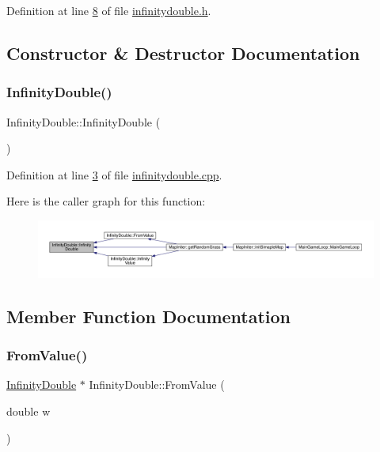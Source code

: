 Definition at line \hyperlink{a00059_source_l00008}{8} of file \hyperlink{a00059_source}{infinitydouble.\+h}.



\subsection{Constructor \& Destructor Documentation}
\mbox{\label{a00161_a8d33637f68b523cf2b21abd1509c47bf}} 
\subsubsection{\texorpdfstring{Infinity\+Double()}{InfinityDouble()}}
{\footnotesize\ttfamily Infinity\+Double\+::\+Infinity\+Double (\begin{DoxyParamCaption}{ }\end{DoxyParamCaption})\hspace{0.3cm}{\ttfamily [private]}}



Definition at line \hyperlink{a00056_source_l00003}{3} of file \hyperlink{a00056_source}{infinitydouble.\+cpp}.

Here is the caller graph for this function\+:
\nopagebreak
\begin{figure}[H]
\begin{center}
\leavevmode
\includegraphics[width=350pt]{d6/d7d/a00161_a8d33637f68b523cf2b21abd1509c47bf_icgraph}
\end{center}
\end{figure}


\subsection{Member Function Documentation}
\mbox{\label{a00161_adb0a2fa93aa5f90a93c3f4303436913a}} 
\subsubsection{\texorpdfstring{From\+Value()}{FromValue()}}
{\footnotesize\ttfamily \hyperlink{a00161}{Infinity\+Double} $\ast$ Infinity\+Double\+::\+From\+Value (\begin{DoxyParamCaption}\item[{double}]{w }\end{DoxyParamCaption})\hspace{0.3cm}{\ttfamily [static]}}



